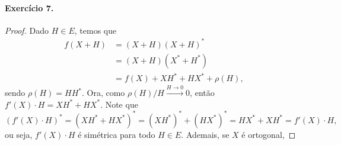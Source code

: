 \documentclass[12pt,a4paper]{article}
\begin{document}
\paragraph{Exercício 7.}
    \begin{proof}
        Dado $H\in E$, temos que
        \begin{align*}
            f(X+H) &= (X+H)(X+H)^* \\
                   &= (X+H)(X^* + H^*) \\
                   &= f(X) + XH^* + HX^* + \rho(H),
        \end{align*}
        sendo $\rho(H) = HH^*$. Ora, como $\rho(H)/H \xrightarrow{H\to 0} 0$, então $f'(X)\cdot H = XH^* + HX^*$.
        Note que
        \begin{equation*}
            (f'(X)\cdot H)^* = (XH^* + HX^*)^* = (XH^*)^* + (HX^*)^* = HX^* + XH^* = f'(X)\cdot H,
        \end{equation*}
        ou seja, $f'(X)\cdot H$ é simétrica para todo $H\in E$. Ademais, se $X$ é ortogonal, 
    \end{proof}
\end{document}

